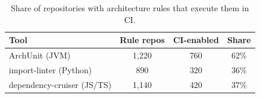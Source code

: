 \begin{table}[t]
\centering
\caption{Share of repositories with architecture rules that execute them in CI.}
\label{tab:ci_share}
\setlength{\aboverulesep}{0pt}
\setlength{\belowrulesep}{0pt}
\renewcommand{\arraystretch}{1.25}
\begin{tabular}{lccc}
\toprule
\textbf{Tool} & \textbf{Rule repos} & \textbf{CI-enabled} & \textbf{Share} \\
\midrule
\rowcolor{rowband}
ArchUnit (JVM) & 1,220 & 760 & 62\% \\
import-linter (Python) & 890 & 320 & 36\% \\
\rowcolor{rowband}
dependency-cruiser (JS/TS) & 1,140 & 420 & 37\% \\
\bottomrule
\end{tabular}
\end{table}
